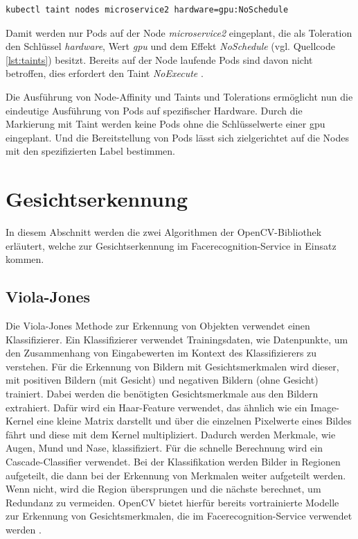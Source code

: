 \begin{lstlisting}[caption={Node-Taints},captionpos=b,label={lst:taints},language=bash]
kubectl taint nodes microservice2 hardware=gpu:NoSchedule
\end{lstlisting}

Damit werden nur Pods auf der Node \textit{microservice2} eingeplant, die als Toleration den Schlüssel \textit{hardware}, Wert \textit{gpu} und dem Effekt \textit{NoSchedule} (vgl. Quellcode \ref{lst:taints}) besitzt.
Bereits auf der Node laufende Pods sind davon nicht betroffen, dies erfordert den Taint \textit{NoExecute} \cite{taintstolerations}.

Die Ausführung von Node-Affinity und Taints und Tolerations ermöglicht nun die eindeutige Ausführung von Pods auf spezifischer Hardware.
Durch die Markierung mit Taint werden keine Pods ohne die Schlüsselwerte einer \acs{gpu} eingeplant.
Und die Bereitstellung von Pods lässt sich zielgerichtet auf die Nodes mit den spezifizierten Label bestimmen.

\section{Gesichtserkennung}
In diesem Abschnitt werden die zwei Algorithmen der OpenCV-Bibliothek erläutert, welche zur Gesichtserkennung im Facerecognition-Service in Einsatz kommen.

\subsection{Viola-Jones}

Die Viola-Jones Methode zur Erkennung von Objekten verwendet einen Klassifizierer.
Ein Klassifizierer verwendet Trainingsdaten, wie Datenpunkte, um den Zusammenhang von Eingabewerten im Kontext des Klassifizierers zu verstehen.
Für die Erkennung von Bildern mit Gesichtsmerkmalen wird dieser, mit positiven Bildern (mit Gesicht) und negativen Bildern (ohne Gesicht) trainiert.
Dabei werden die benötigten Gesichtsmerkmale aus den Bildern extrahiert.
Dafür wird ein Haar-Feature verwendet, das ähnlich wie ein Image-Kernel eine kleine Matrix darstellt und über die einzelnen Pixelwerte eines Bildes fährt und diese mit dem Kernel multipliziert.
Dadurch werden Merkmale, wie Augen, Mund und Nase, klassifiziert.
Für die schnelle Berechnung wird ein Cascade-Classifier verwendet. 
Bei der Klassifikation werden Bilder in Regionen aufgeteilt, die dann bei der Erkennung von Merkmalen weiter aufgeteilt werden. 
Wenn nicht, wird die Region übersprungen und die nächste berechnet, um Redundanz zu vermeiden.
OpenCV bietet hierfür bereits vortrainierte Modelle zur Erkennung von Gesichtsmerkmalen, die im Facerecognition-Service verwendet werden \cite{opencvcascade}.


